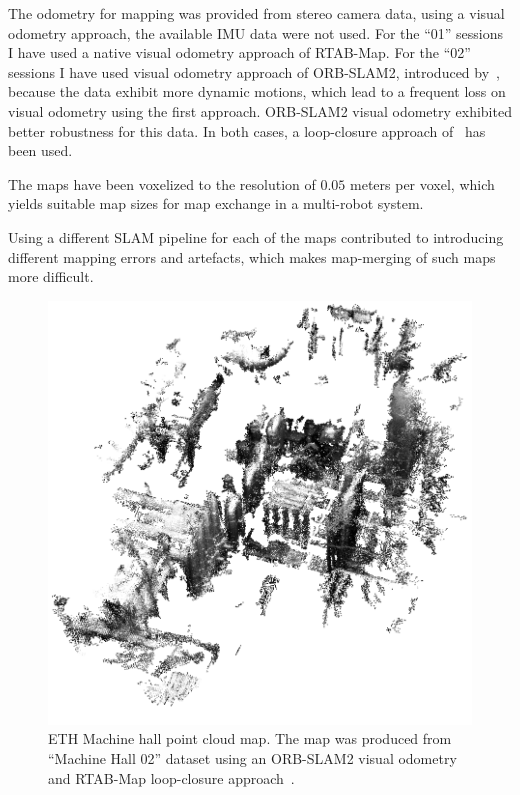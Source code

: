 The odometry for mapping was provided from stereo camera data, using a visual odometry approach, the available \gls{IMU} data were not used. For the ``01'' sessions I have used a native visual odometry approach of RTAB-Map. For the ``02'' sessions I have used visual odometry approach of {ORB-SLAM2}, introduced by~\citet{mur2017orb}, because the data exhibit more dynamic motions, which lead to a frequent loss on visual odometry using the first approach. {ORB-SLAM2} visual odometry exhibited better robustness for this data. In both cases, a loop-closure approach of~\citet{labbe2014online} has been used.

The maps have been voxelized to the resolution of $0.05$ meters per voxel, which yields suitable map sizes for map exchange in a multi-robot system.

Using a different \gls{SLAM} pipeline for each of the maps contributed to introducing different mapping errors and artefacts, which makes map-merging of such maps more difficult.

\begin{figure}
    \centering
    \includegraphics[width=\textwidth]{../img/euroc_mh_02.png}
    \caption[Machine hall point cloud map]{ETH Machine hall point cloud map. The map was produced from ``Machine Hall 02'' dataset using an {ORB-SLAM2} visual odometry~\citep{mur2017orb} and RTAB-Map loop-closure approach~\citep{labbe2014online}.}
    \label{fig:euroc_mh_02}
\end{figure}

